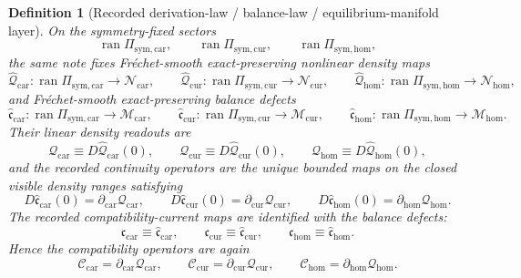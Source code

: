 \documentclass[11pt]{article}
\newcommand{\TensorSymProj}{\Pi_{\mathrm{sym,car}}}
\newcommand{\CurSymProj}{\Pi_{\mathrm{sym,cur}}}
\newcommand{\HomSymProj}{\Pi_{\mathrm{sym,hom}}}
\newcommand{\TensorCompat}{\mathcal C_{\mathrm{car}}}
\newcommand{\CurCompat}{\mathcal C_{\mathrm{cur}}}
\newcommand{\HomCompat}{\mathcal C_{\mathrm{hom}}}
\newcommand{\TensorCurrent}{\mathfrak c_{\mathrm{car}}}
\newcommand{\CurCurrent}{\mathfrak c_{\mathrm{cur}}}
\newcommand{\HomCurrent}{\mathfrak c_{\mathrm{hom}}}
\newcommand{\TensorDensityClass}{\mathscr N_{\mathrm{car}}}
\newcommand{\CurDensityClass}{\mathscr N_{\mathrm{cur}}}
\newcommand{\HomDensityClass}{\mathscr N_{\mathrm{hom}}}
\newcommand{\TensorDensity}{\mathcal Q_{\mathrm{car}}}
\newcommand{\CurDensity}{\mathcal Q_{\mathrm{cur}}}
\newcommand{\HomDensity}{\mathcal Q_{\mathrm{hom}}}
\newcommand{\TensorCont}{\partial_{\mathrm{car}}}
\newcommand{\CurCont}{\partial_{\mathrm{cur}}}
\newcommand{\HomCont}{\partial_{\mathrm{hom}}}
\newcommand{\TensorPrimitiveDensity}{\widehat{\mathcal Q}_{\mathrm{car}}}
\newcommand{\CurPrimitiveDensity}{\widehat{\mathcal Q}_{\mathrm{cur}}}
\newcommand{\HomPrimitiveDensity}{\widehat{\mathcal Q}_{\mathrm{hom}}}
\newcommand{\TensorBalance}{\widehat{\mathfrak c}_{\mathrm{car}}}
\newcommand{\CurBalance}{\widehat{\mathfrak c}_{\mathrm{cur}}}
\newcommand{\HomBalance}{\widehat{\mathfrak c}_{\mathrm{hom}}}
\newtheorem{definition}{Definition}
\begin{document}
\begin{definition}[Recorded derivation-law / balance-law / equilibrium-manifold layer]
On the symmetry-fixed sectors
\[
\operatorname{ran}\TensorSymProj,\qquad
\operatorname{ran}\CurSymProj,\qquad
\operatorname{ran}\HomSymProj,
\]
the same note fixes Fr\'echet-smooth exact-preserving nonlinear density maps
\[
\TensorPrimitiveDensity:\operatorname{ran}\TensorSymProj\to\TensorDensityClass,\qquad
\CurPrimitiveDensity:\operatorname{ran}\CurSymProj\to\CurDensityClass,\qquad
\HomPrimitiveDensity:\operatorname{ran}\HomSymProj\to\HomDensityClass,
\]
and Fr\'echet-smooth exact-preserving balance defects
\[
\TensorBalance:\operatorname{ran}\TensorSymProj\to\mathscr M_{\mathrm{car}},\qquad
\CurBalance:\operatorname{ran}\CurSymProj\to\mathscr M_{\mathrm{cur}},\qquad
\HomBalance:\operatorname{ran}\HomSymProj\to\mathscr M_{\mathrm{hom}}.
\]
Their linear density readouts are
\begin{equation}
\TensorDensity\equiv D\TensorPrimitiveDensity(0),\qquad
\CurDensity\equiv D\CurPrimitiveDensity(0),\qquad
\HomDensity\equiv D\HomPrimitiveDensity(0),
\label{eq:recorded_density_linearizations}
\end{equation}
and the recorded continuity operators are the unique bounded maps on the closed visible density ranges satisfying
\begin{equation}
D\TensorBalance(0)=\TensorCont\TensorDensity,\qquad
D\CurBalance(0)=\CurCont\CurDensity,\qquad
D\HomBalance(0)=\HomCont\HomDensity.
\label{eq:recorded_balance_factorization}
\end{equation}
The recorded compatibility-current maps are identified with the balance defects:
\begin{equation}
\TensorCurrent\equiv\TensorBalance,\qquad
\CurCurrent\equiv\CurBalance,\qquad
\HomCurrent\equiv\HomBalance.
\label{eq:recorded_current_identification}
\end{equation}
Hence the compatibility operators are again
\begin{equation}
\TensorCompat=\TensorCont\TensorDensity,\qquad
\CurCompat=\CurCont\CurDensity,\qquad
\HomCompat=\HomCont\HomDensity.
\label{eq:recorded_compat_from_balance}
\end{equation}


\end{definition}
\end{document}
